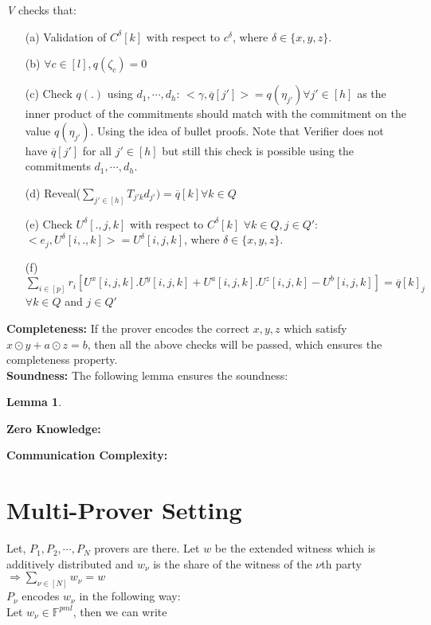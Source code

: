 \documentclass{article}
\newtheorem{lemma}[theorem]{Lemma}
\begin{document}
\textit{V} checks that:
\begin{itemize}
	\item[(a)] Validation of $C^{\delta}[k]$ with respect to $c^{\delta}$, where $\delta\in\{x,y,z\}$. 
	\item[(b)] $\forall c\in[l], q(\zeta_c)=0$
	\item[(c)] Check $q(.)$ using $d_1,\cdots,d_h$: $<\gamma,\overline{q}[j']>=q(\eta_{j'})\forall j'\in[h]$ as the inner product of the commitments should match with the commitment on the value $q(\eta_{j'})$. Using the idea of bullet proofs. Note that Verifier does not have $\overline{q}[j'] $ for all $j'\in[h]$ but still this check is possible using the commitments $d_1,\cdots, d_h$.
	\item[(d)] Reveal($\sum\limits_{j'\in [h]} T_{j'k} d_{j'})=\overline{q}[k] \forall k\in Q$
	\item[(e)] Check $U^{\delta}[.,j,k]$ with respect to $C^{\delta}[k]$ $\forall k\in Q,  j\in Q'$: $<e_j,U^{\delta}[i,.,k]>=U^{\delta}[i,j,k]$, where $\delta\in\{x,y,z\}$. 
	\item[(f)] $\sum\limits_{i\in[p]} r_{i}[U^x[i,j,k].U^y[i,j,k]+U^a[i,j,k].U^z[i,j,k]-U^b[i,j,k]]=\overline{q}[k]_j$ $\forall k\in Q$ and $j\in Q'$\\
\end{itemize}

\textbf{Completeness:} If the prover encodes the correct $x,y,z$ which satisfy $x\odot y + a\odot z=b$, then all the above checks will be passed, which ensures the completeness property.\\

\textbf{Soundness:} The following lemma ensures the soundness:

\begin{lemma}
		
\end{lemma}

\textbf{Zero Knowledge:}

\textbf{Communication Complexity:}
\section{Multi-Prover Setting}

Let, $P_1,P_2,\cdots,P_N$ provers are there. Let $w$ be the extended witness which is additively distributed and $w_{\nu}$ is the share of the witness of the $\nu$th party $\Rightarrow \sum\limits_{\nu \in [N]}w_{\nu}=w$\\
$P_{\nu}$ encodes $w_{\nu}$ in the following way:\\
Let $w_{\nu}\in \mathbb{F}^{pml}$, then we can write 
\end{document}
